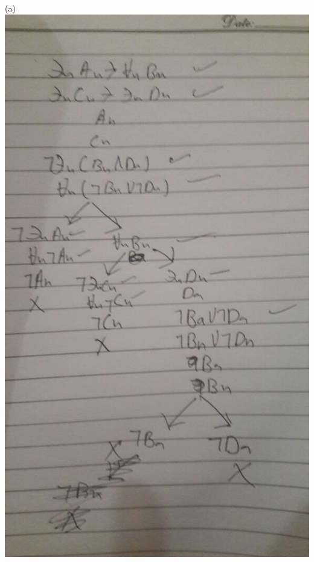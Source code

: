 \documentclass{article}
\begin{document}
(a) \includegraphics[width=\linewidth]{IMG_1018.JPG}
\end{document}
